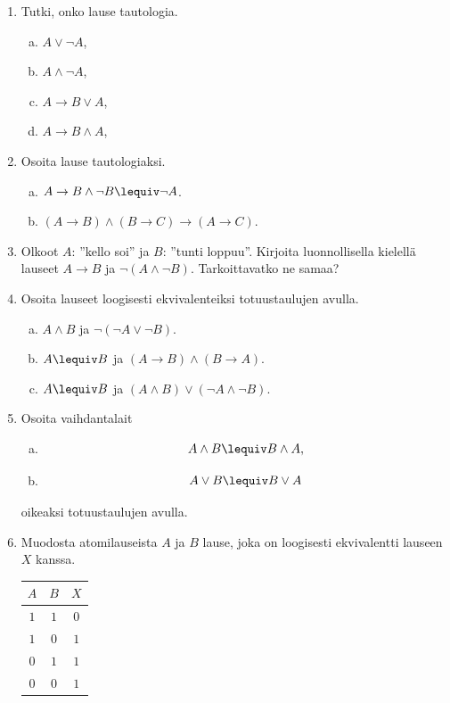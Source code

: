


\Harjoitustehtavat

\begin{enumerate}
\item Tutki, onko lause tautologia.
\begin{enumerate}[a)]
\item $A\lor \lnot A$,
\item $A \land \lnot A$,
\item $A \to B \lor A$,
\item $A \to B \land A$,
\end{enumerate}

\item Osoita lause tautologiaksi.
\begin{enumerate}[a)]
\item $A\to B\land \lnot B \lequiv \lnot A$.
\item $(A\to B) \land (B\to C)\to (A\to C)$.
\end{enumerate}

\item Olkoot $A$: ''kello soi'' ja $B$: ''tunti loppuu''.
Kirjoita luonnollisella kielellä lauseet $A\to B$ ja
$\lnot(A \land \lnot B )$. Tarkoittavatko ne samaa?

\item Osoita lauseet loogisesti ekvivalenteiksi
totuustaulujen avulla.
\begin{enumerate}[a)]
\item $A\land B$ ja $\lnot(\lnot A\lor \lnot B )$.
\item $A\lequiv B$ ja $(A\to B)\land (B \to A)$.
\item $A\lequiv B$ ja $(A\land B) \lor (\lnot A\land
\lnot B )$.
\end{enumerate}

\item Osoita vaihdantalait
\begin{enumerate}[a)]
\item
\[
A \land B \lequiv B \land A,
\]
\item
\[
A \lor B \lequiv B \lor A
\]
\end{enumerate}
oikeaksi totuustaulujen avulla.

\item Muodosta atomilauseista $A$ ja $B$ lause, joka on
loogisesti ekvivalentti lauseen $X$ kanssa.
\begin{center}
\begin{tabular}{|c|c|c|}\hline
$A$ & $B$ & $X$\\ \hline
$1$ & $1$ & $0$\\
$1$ & $0$ & $1$\\
$0$ & $1$ & $1$\\
$0$ & $0$ & $1$\\ \hline
\end{tabular}
\end{center}


\end{enumerate}
